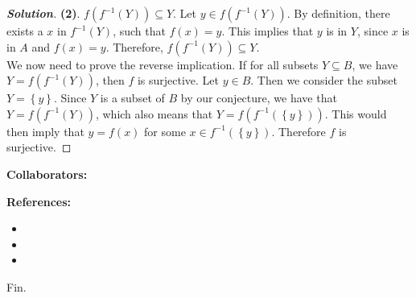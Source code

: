 \documentclass[11pt]{article}
\newenvironment{problem}[2][Problem\!]{\begin{trivlist}
\item[\hskip \labelsep {\bfseries #1}\hskip \labelsep {\bfseries #2.}]}{\end{trivlist}}
\newenvironment{solution}{\begin{proof}[\textbf{\textit{Solution}}]}{\end{proof}}
\newcommand{\set}[1]{\left\{#1\right\}} %
\begin{document}
\begin{problem}{8.3}
\begin{itemize}[itemsep=3em]
\begin{solution}
    \textbf{(2)}. \(f(f^{-1}(Y)) \subseteq Y\). Let \(y \in f(f^{-1}(Y))\). By definition, there exists a \(x\) in \(f^{-1}(Y)\), such that \(f(x) = y\). This implies that \(y\) is in \(Y\), since \(x\) is in \(A\) and \(f(x) = y\). Therefore, \(f(f^{-1}(Y)) \subseteq Y\).\\
    We now need to prove the reverse implication. If for all subsets \(Y \subseteq B\), we have \(Y = f(f^{-1}(Y))\), then \(f\) is surjective. Let \(y \in B\). Then we consider the subset \(Y = \set{y}\). Since \(Y\) is a subset of \(B\) by our conjecture, we have that \(Y = f(f^{-1}(Y))\), which also means that \(Y = f(f^{-1}(\set{y}))\). This would then imply that \(y = f(x)\) for some \(x \in f^{-1}(\set{y})\). Therefore \(f\) is surjective.
    \end{solution}

\end{itemize}
\end{problem}

\newpage  %



\begin{center}
\textbf{Collaborators:}
\end{center}
\vfill 

\begin{center}
\textbf{References:}
\end{center}
\begin{itemize}
\item[$\bullet$] [Book(s): Title, Author]
\item[$\bullet$] [Online: \href{http://example.com/}{Link}]
\item[$\bullet$] [Notes: \href{http://example.com/}{Link}]
\end{itemize}

\vfill
\begin{center}
Fin.
\end{center}
\vfill
\end{document}
